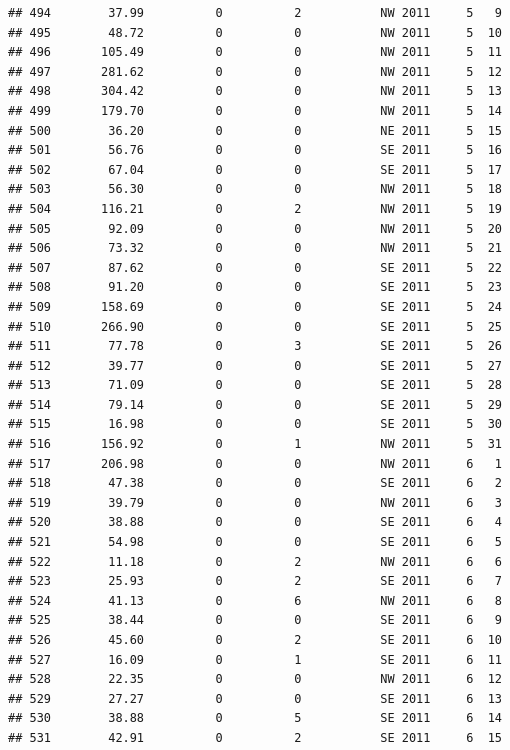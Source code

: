 \documentclass[
]{article}
\begin{document}
\begin{verbatim}
## 494        37.99          0          2           NW 2011     5   9
## 495        48.72          0          0           NW 2011     5  10
## 496       105.49          0          0           NW 2011     5  11
## 497       281.62          0          0           NW 2011     5  12
## 498       304.42          0          0           NW 2011     5  13
## 499       179.70          0          0           NW 2011     5  14
## 500        36.20          0          0           NE 2011     5  15
## 501        56.76          0          0           SE 2011     5  16
## 502        67.04          0          0           SE 2011     5  17
## 503        56.30          0          0           NW 2011     5  18
## 504       116.21          0          2           NW 2011     5  19
## 505        92.09          0          0           NW 2011     5  20
## 506        73.32          0          0           NW 2011     5  21
## 507        87.62          0          0           SE 2011     5  22
## 508        91.20          0          0           SE 2011     5  23
## 509       158.69          0          0           SE 2011     5  24
## 510       266.90          0          0           SE 2011     5  25
## 511        77.78          0          3           SE 2011     5  26
## 512        39.77          0          0           SE 2011     5  27
## 513        71.09          0          0           SE 2011     5  28
## 514        79.14          0          0           SE 2011     5  29
## 515        16.98          0          0           SE 2011     5  30
## 516       156.92          0          1           NW 2011     5  31
## 517       206.98          0          0           NW 2011     6   1
## 518        47.38          0          0           SE 2011     6   2
## 519        39.79          0          0           NW 2011     6   3
## 520        38.88          0          0           SE 2011     6   4
## 521        54.98          0          0           SE 2011     6   5
## 522        11.18          0          2           NW 2011     6   6
## 523        25.93          0          2           SE 2011     6   7
## 524        41.13          0          6           NW 2011     6   8
## 525        38.44          0          0           SE 2011     6   9
## 526        45.60          0          2           SE 2011     6  10
## 527        16.09          0          1           SE 2011     6  11
## 528        22.35          0          0           NW 2011     6  12
## 529        27.27          0          0           SE 2011     6  13
## 530        38.88          0          5           SE 2011     6  14
## 531        42.91          0          2           SE 2011     6  15

\end{verbatim}
\end{document}
